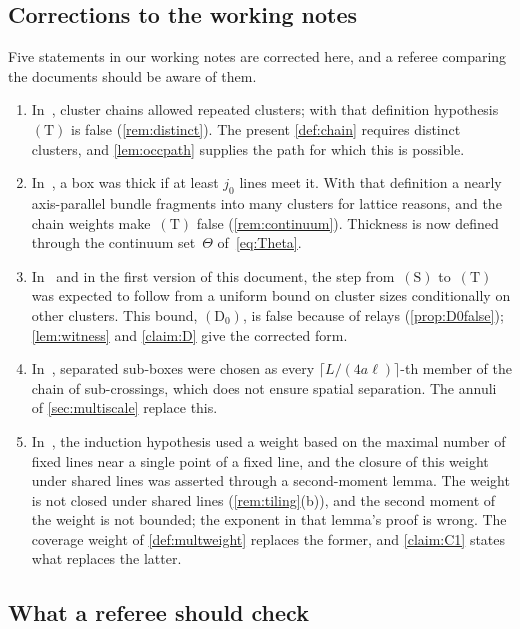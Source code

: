 \documentclass[11pt,letterpaper]{article}
\begin{document}
\subsection{Corrections to the working notes}

Five statements in our working notes are corrected here, and a referee comparing the documents should be aware of them.
\begin{enumerate}
  \item In~\cite{FM26}, cluster chains allowed repeated clusters; with that definition hypothesis~$\mathrm{(T)}$ is false (\cref{rem:distinct}). The present \cref{def:chain} requires distinct clusters, and \cref{lem:occpath} supplies the path for which this is possible.
  \item In~\cite{FM26}, a box was thick if at least $j_0$ lines meet it. With that definition a nearly axis-parallel bundle fragments into many clusters for lattice reasons, and the chain weights make~$\mathrm{(T)}$ false (\cref{rem:continuum}). Thickness is now defined through the continuum set~$\Theta$ of~\eqref{eq:Theta}.
  \item In~\cite{FM26} and in the first version of this document, the step from~$\mathrm{(S)}$ to~$\mathrm{(T)}$ was expected to follow from a uniform bound on cluster sizes conditionally on other clusters. This bound, $\mathrm{(D_0)}$, is false because of relays (\cref{prop:D0false}); \cref{lem:witness} and \cref{claim:D} give the corrected form.
  \item In~\cite{MS26}, separated sub-boxes were chosen as every $\lceil L/(4a\ell)\rceil$-th member of the chain of sub-crossings, which does not ensure spatial separation. The annuli of \cref{sec:multiscale} replace this.
  \item In~\cite{MS26}, the induction hypothesis used a weight based on the maximal number of fixed lines near a single point of a fixed line, and the closure of this weight under shared lines was asserted through a second-moment lemma. The weight is not closed under shared lines (\cref{rem:tiling}(b)), and the second moment of the weight is not bounded; the exponent in that lemma's proof is wrong. The coverage weight of \cref{def:multweight} replaces the former, and \cref{claim:C1} states what replaces the latter.
\end{enumerate}

\subsection{What a referee should check}
\end{document}
